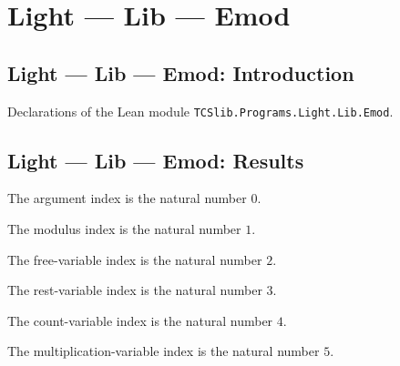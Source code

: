 \section{Light --- Lib --- Emod}
\subsection*{Light --- Lib --- Emod: Introduction}

Declarations of the Lean module \texttt{TCSlib.Programs.Light.Lib.Emod}.

\subsection*{Light --- Lib --- Emod: Results}

\begin{definition}
\label{Light.Emod.Arg}
\leanok
The argument index is the natural number $0$.
\end{definition}

\begin{definition}
\label{Light.Emod.Modulus}
\leanok
{}
The modulus index is the natural number $1$.
\end{definition}

\begin{definition}
\label{Light.Emod.Free}
\leanok
{}
The free-variable index is the natural number $2$.
\end{definition}

\begin{definition}
\label{Light.Emod.Rest}
\leanok
{}
The rest-variable index is the natural number $3$.
\end{definition}

\begin{definition}
\label{Light.Emod.Count}
\leanok
{}
The count-variable index is the natural number $4$.
\end{definition}

\begin{definition}
\label{Light.Emod.Mult}
\leanok
{}
The multiplication-variable index is the natural number $5$.
\end{definition}

